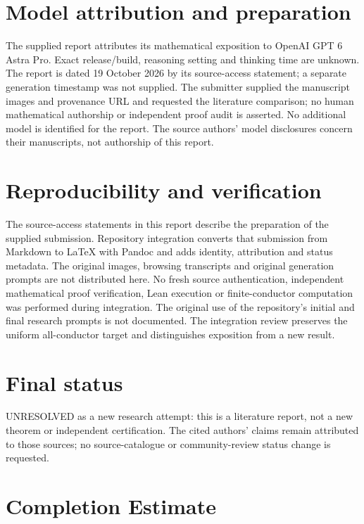 \documentclass[11pt]{article}
\begin{document}
\section{Model attribution and preparation}\label{model-attribution-and-preparation}

The supplied report attributes its mathematical exposition to OpenAI GPT 6 Astra Pro. Exact release/build, reasoning setting and thinking time are unknown. The report is dated 19 October 2026 by its source-access statement; a separate generation timestamp was not supplied. The submitter supplied the manuscript images and provenance URL and requested the literature comparison; no human mathematical authorship or independent proof audit is asserted. No additional model is identified for the report. The source authors' model disclosures concern their manuscripts, not authorship of this report.

\section{Reproducibility and verification}\label{reproducibility-and-verification}

The source-access statements in this report describe the preparation of the supplied submission. Repository integration converts that submission from Markdown to LaTeX with Pandoc and adds identity, attribution and status metadata. The original images, browsing transcripts and original generation prompts are not distributed here. No fresh source authentication, independent mathematical proof verification, Lean execution or finite-conductor computation was performed during integration. The original use of the repository's initial and final research prompts is not documented. The integration review preserves the uniform all-conductor target and distinguishes exposition from a new result.

\section{Final status}\label{final-status}

UNRESOLVED as a new research attempt: this is a literature report, not a new theorem or independent certification. The cited authors' claims remain attributed to those sources; no source-catalogue or community-review status change is requested.

\section{Completion Estimate}\label{completion-estimate}
\end{document}
